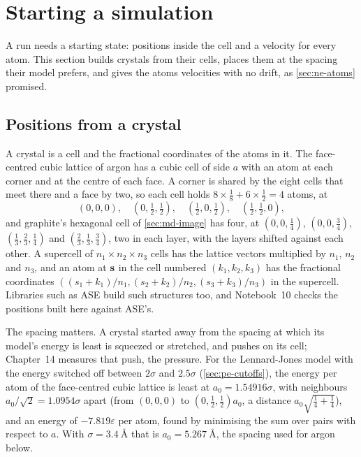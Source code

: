 \section{Starting a simulation}
\label{sec:md-start}

A run needs a starting state: positions inside the cell and a velocity
for every atom. This section builds crystals from their cells, places
them at the spacing their model prefers, and gives the atoms velocities
with no drift, as \cref{sec:ne-atoms} promised.

\subsection*{Positions from a crystal}

A crystal is a cell and the fractional coordinates of the atoms in it.
The face-centred cubic lattice of argon has a cubic cell of side $a$ with
an atom at each corner and at the centre of each face. A corner is shared
by the eight cells that meet there and a face by two, so each cell holds
$8\times\frac18 + 6\times\frac12 = 4$ atoms, at
\begin{equation*}
   (0, 0, 0) , \quad (0, \tfrac12, \tfrac12) , \quad (\tfrac12, 0, \tfrac12) ,
   \quad (\tfrac12, \tfrac12, 0) ,
\end{equation*}
and graphite's hexagonal cell of \cref{sec:md-image} has four, at $(0, 0,
\frac14)$, $(0, 0, \frac34)$, $(\frac13, \frac23, \frac14)$ and $(\frac23,
\frac13, \frac34)$, two in each layer, with the layers shifted against each
other\cite{TrucanoChen1975}. A supercell of $n_1\times n_2\times n_3$ cells
has the lattice vectors multiplied by $n_1$, $n_2$ and $n_3$, and an atom
at $\bm{\mathrm{s}}$ in the cell numbered $(k_1, k_2, k_3)$ has the fractional
coordinates $((s_1 + k_1)/n_1, (s_2 + k_2)/n_2, (s_3 + k_3)/n_3)$ in the
supercell. Libraries such as ASE\cite{Larsen2017} build such structures
too, and Notebook~10 checks the positions built here against ASE's.

The spacing matters. A crystal started away from the spacing at which its
model's energy is least is squeezed or stretched, and pushes on its cell;
Chapter~14 measures that push, the pressure. For the Lennard-Jones model
with the energy switched off between $2\sigma$ and $2.5\sigma$
(\cref{sec:pe-cutoffs}), the energy per atom of the face-centred cubic
lattice is least at $a_0 = 1.54916\sigma$, with neighbours $a_0/\sqrt2 =
1.0954\sigma$ apart (from $(0, 0, 0)$ to $(0, \frac12, \frac12)a_0$, a
distance $a_0\sqrt{\frac14 + \frac14}$), and an energy of
$-7.819\varepsilon$ per atom, found by
minimising the sum over pairs with respect to $a$. With $\sigma =
\SI{3.4}{\angstrom}$ that is $a_0 = \SI{5.267}{\angstrom}$, the spacing
used for argon below.

